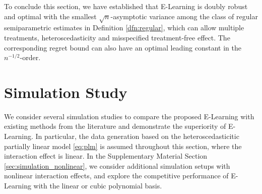 \documentclass[11pt]{article}
\newtheorem{prop}[thm]{Proposition}
\theoremstyle{definition}
\newtheorem{asm}{Assumption}
\theoremstyle{remark}
\newcommand{\bX}{\bm{X}}
\newcommand{\bbE}{\mathbb{E}}
\newcommand{\bbP}{\mathbb{P}}
\newcommand{\cV}{\mathcal{V}}
\newcommand{\sM}{\mathscr{M}}
\begin{document}
To conclude this section, we have established that E-Learning is doubly robust and optimal with the smallest $\sqrt{n}$-asymptotic variance among the class of regular semiparametric estimates in Definition \ref{dfn:regular}, which can allow multiple treatments, heteroscedasticity and misspecified treatment-free effect. The corresponding regret bound can also have an optimal leading constant in the $n^{-1/2}$-order.

%

\section{Simulation Study}\label{sec:simulation}

We consider several simulation studies to compare the proposed E-Learning with existing methods from the literature and demonstrate the superiority of E-Learning. In particular, the data generation based on the heteroscedasticitic partially linear model \eqref{eq:plm} is assumed throughout this section, where the interaction effect is linear. In the Supplementary Material Section \ref{sec:simulation_nonlinear}, we consider additional simulation setups with nonlinear interaction effects, and explore the competitive performance of E-Learning with the linear or cubic polynomial basis.
\end{document}
